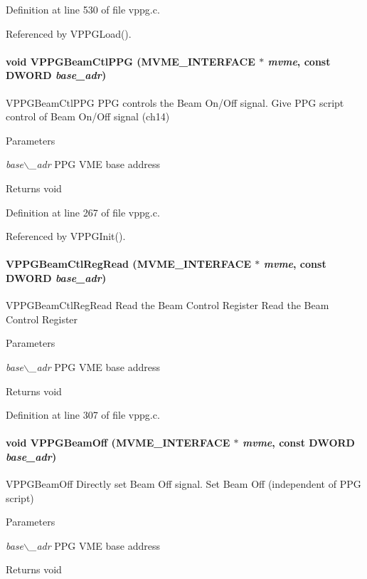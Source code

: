Definition at line 530 of file vppg.c.

Referenced by VPPGLoad().
\paragraph[{VPPGBeamCtlPPG}]{\setlength{\rightskip}{0pt plus 5cm}void VPPGBeamCtlPPG ({\bf MVME\_\-INTERFACE} $\ast$ {\em mvme}, \/  const {\bf DWORD} {\em base\_\-adr})}\hfill\label{vppg_8h_a243cf578335a36f73dafcacfc457aaaa}
VPPGBeamCtlPPG PPG controls the Beam On/Off signal.  Give PPG script control of Beam On/Off signal (ch14) 
\begin{DoxyParams}{Parameters}
\item[{\em base$\backslash$\_\-adr}]PPG VME base address \end{DoxyParams}
\begin{DoxyReturn}{Returns}
void 
\end{DoxyReturn}


Definition at line 267 of file vppg.c.

Referenced by VPPGInit().
\paragraph[{VPPGBeamCtlRegRead}]{ VPPGBeamCtlRegRead ({\bf MVME\_\-INTERFACE} $\ast$ {\em mvme}, \/  const {\bf DWORD} {\em base\_\-adr})}\hfill\label{vppg_8h_a57fead0a3fec6c6b119298e43a26a3e5}
VPPGBeamCtlRegRead Read the Beam Control Register  Read the Beam Control Register 
\begin{DoxyParams}{Parameters}
\item[{\em base$\backslash$\_\-adr}]PPG VME base address \end{DoxyParams}
\begin{DoxyReturn}{Returns}
void 
\end{DoxyReturn}


Definition at line 307 of file vppg.c.
\paragraph[{VPPGBeamOff}]{\setlength{\rightskip}{0pt plus 5cm}void VPPGBeamOff ({\bf MVME\_\-INTERFACE} $\ast$ {\em mvme}, \/  const {\bf DWORD} {\em base\_\-adr})}\hfill\label{vppg_8h_a2cdff7a4d21921939992eba5946ea4ad}
VPPGBeamOff Directly set Beam Off signal.  Set Beam Off (independent of PPG script) 
\begin{DoxyParams}{Parameters}
\item[{\em base$\backslash$\_\-adr}]PPG VME base address \end{DoxyParams}
\begin{DoxyReturn}{Returns}
void 
\end{DoxyReturn}


